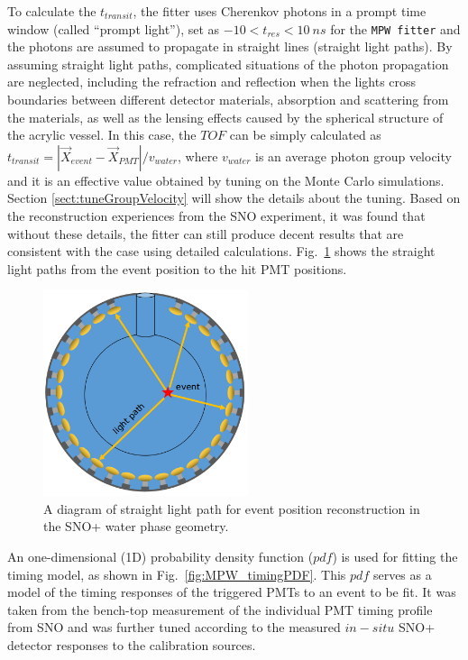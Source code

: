 To calculate the $t_{transit}$, the fitter uses Cherenkov photons in a prompt time window (called ``prompt light''), set as $-10<t_{res}<10~ns$ for the \texttt{MPW fitter} and the photons are assumed to propagate in straight lines (straight light paths). By assuming straight light paths, complicated situations of the photon propagation are neglected, including the refraction and reflection when the lights cross boundaries between different detector materials, absorption and scattering from the materials, as well as the lensing effects caused by the spherical structure of the acrylic vessel. In this case, the $TOF$ can be simply calculated as $t_{transit}=|\vec{X}_{event}-\vec{X}_{PMT}|/v_{water}$, where $v_{water}$ is an average photon group velocity and it is an effective value obtained by tuning on the Monte Carlo simulations. Section \ref{sect:tuneGroupVelocity} will show the details about the tuning. Based on the reconstruction experiences from the SNO experiment, it was found that without these details, the fitter can still produce decent results that are consistent with the case using detailed calculations\cite{boulay2004direct,jones2011background}. Fig.~\ref{mpwdiagram_position} shows the straight light paths from the event position to the hit PMT positions.
\begin{figure}[htbp]
	\centering
   \includegraphics[width=6cm]{mpwDiagram.png}
	\caption{A diagram of straight light path for event position reconstruction in the SNO+ water phase geometry.}
	\label{mpwdiagram_position}
\end{figure}

An one-dimensional (1D) probability density function ($pdf$) is used for fitting the timing model, as shown in Fig.~\ref{fig:MPW_timingPDF}. This $pdf$ serves as a model of the timing responses of the triggered PMTs to an event to be fit. It was taken from the bench-top measurement of the individual PMT timing profile from SNO\cite{jillings1996photomultiplier} and was further tuned according to the measured $in-situ$ SNO+ detector responses to the calibration sources\cite{anderson2021optical}.


